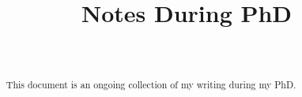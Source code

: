 \documentclass[aos,preprint]{imsart}
\numberwithin{equation}{section}
\begin{document}
\begin{frontmatter}
\title{Notes During PhD}

\begin{aug}
\author[A]{~ }
\address[A]{Centrum Wiskunde \& Informatica, Amsterdam, The Netherlands.}
\end{aug}

\end{frontmatter}


\tableofcontents

\begin{abstract}
    \noindent
    This document is an ongoing collection of my writing during my PhD.
\end{abstract}









\clearpage

\nocite{*}



\end{document}
